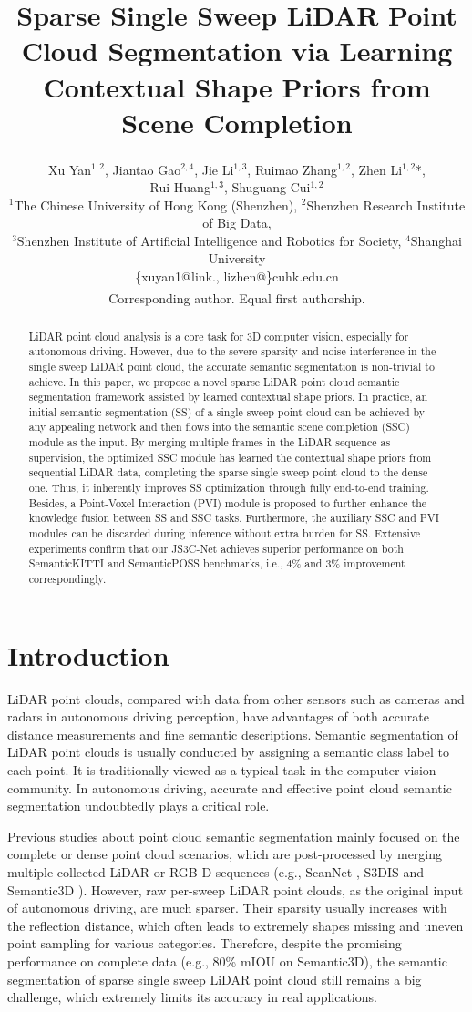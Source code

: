 \documentclass[11pt,twocolumn]{article}
\title{Sparse Single Sweep LiDAR Point Cloud Segmentation via Learning Contextual Shape Priors from Scene Completion}
\author{
  Xu Yan$^{1,2}$\textsuperscript{\dagger}, Jiantao Gao$^{2,4}$\textsuperscript{\dagger}, Jie Li$^{1,3}$, Ruimao Zhang$^{1,2}$, Zhen Li$^{1,2}$*,\\
  Rui Huang$^{1,3}$, Shuguang Cui$^{1,2}$\\
  \small $^1$The Chinese University of Hong Kong (Shenzhen), $^2$Shenzhen Research Institute of Big Data,\\
  \small $^3$Shenzhen Institute of Artificial Intelligence and Robotics for Society, $^4$Shanghai University\\
  \small \{xuyan1@link., lizhen@\}cuhk.edu.cn\\
  \small *Corresponding author. \textsuperscript{\dagger}Equal first authorship.
}
\date{}
\begin{document}
\maketitle

\begin{abstract}
LiDAR point cloud analysis is a core task for 3D computer vision, especially for autonomous driving. However, due to the severe sparsity and noise interference in the single sweep LiDAR point cloud, the accurate semantic segmentation is non-trivial to achieve. In this paper, we propose a novel sparse LiDAR point cloud semantic segmentation framework assisted by learned contextual shape priors. In practice, an initial semantic segmentation (SS) of a single sweep point cloud can be achieved by any appealing network and then flows into the semantic scene completion (SSC) module as the input. By merging multiple frames in the LiDAR sequence as supervision, the optimized SSC module has learned the contextual shape priors from sequential LiDAR data, completing the sparse single sweep point cloud to the dense one. Thus, it inherently improves SS optimization through fully end-to-end training. Besides, a Point-Voxel Interaction (PVI) module is proposed to further enhance the knowledge fusion between SS and SSC tasks. Furthermore, the auxiliary SSC and PVI modules can be discarded during inference without extra burden for SS. Extensive experiments confirm that our JS3C-Net achieves superior performance on both SemanticKITTI and SemanticPOSS benchmarks, i.e., 4\% and 3\% improvement correspondingly.
\end{abstract}

\section{Introduction}
\label{sec:intro}

LiDAR point clouds, compared with data from other sensors such as cameras and radars in autonomous driving perception, have advantages of both accurate distance measurements and fine semantic descriptions. Semantic segmentation of LiDAR point clouds is usually conducted by assigning a semantic class label to each point. It is traditionally viewed as a typical task in the computer vision community. In autonomous driving, accurate and effective point cloud semantic segmentation undoubtedly plays a critical role.

Previous studies \cite{thomas2019,wu2019} about point cloud semantic segmentation mainly focused on the complete or dense point cloud scenarios, which are post-processed by merging multiple collected LiDAR or RGB-D sequences (e.g., ScanNet \cite{dai2017}, S3DIS \cite{armeni2017} and Semantic3D \cite{riegler2017}). However, raw per-sweep LiDAR point clouds, as the original input of autonomous driving, are much sparser. Their sparsity usually increases with the reflection distance, which often leads to extremely shapes missing and uneven point sampling for various categories. Therefore, despite the promising performance on complete data (e.g., 80\% mIOU on Semantic3D), the semantic segmentation of sparse single sweep LiDAR point cloud still remains a big challenge, which extremely limits its accuracy in real applications.
\end{document}
